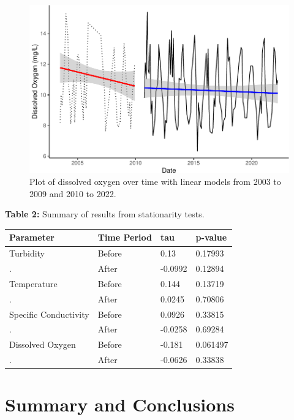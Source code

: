 \documentclass[
  12pt,
]{article}
\begin{document}
\newpage

\begin{figure}

{\centering \includegraphics{Fischer_WDA_FinalProject_files/figure-latex/Plot of Dissolved Oxygen over time with LMs-1} 

}

\caption{Plot of dissolved oxygen over time with linear models from 2003 to 2009 and 2010 to 2022.}\label{fig:Plot of Dissolved Oxygen over time with LMs}
\end{figure}

\newpage

\textbf{Table 2:} Summary of results from stationarity tests.

\begin{longtable}[]{@{}llll@{}}
\toprule
Parameter & Time Period & tau & p-value \\
\midrule
\endhead
Turbidity & Before & 0.13 & 0.17993 \\
. & After & -0.0992 & 0.12894 \\
Temperature & Before & 0.144 & 0.13719 \\
. & After & 0.0245 & 0.70806 \\
Specific Conductivity & Before & 0.0926 & 0.33815 \\
. & After & -0.0258 & 0.69284 \\
Dissolved Oxygen & Before & -0.181 & 0.061497 \\
. & After & -0.0626 & 0.33838 \\
\bottomrule
\end{longtable}

\newpage

\hypertarget{summary-and-conclusions}{%
\section{Summary and Conclusions}\label{summary-and-conclusions}}
\end{document}
